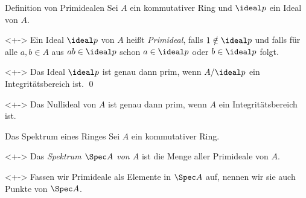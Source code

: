 
\begin{frame}{Definition von Primidealen}
    Sei \(A\) ein kommutativer Ring und \(\ideal p\) ein Ideal von \(A\).
    \begin{definition}<+->
        Ein Ideal \(\ideal p\) von \(A\) heißt \emph{Primideal}, falls
        \(1 \notin \ideal p\) und falls für alle \(a, b \in A\) aus
        \(a b \in \ideal p\) schon \(a \in \ideal p\) oder \(b \in \ideal p\)
        folgt.
    \end{definition}
    \begin{proposition}<+->
        Das Ideal \(\ideal p\) ist genau dann prim, wenn \(A/\ideal p\) ein 
        Integritätsbereich ist.
        \qed
    \end{proposition}
    \begin{example}<+->
        Das Nullideal von \(A\) ist genau dann prim, wenn \(A\) ein
        Integritätsbereich ist.
    \end{example}
\end{frame}

\begin{frame}{Das Spektrum eines Ringes}
    Sei \(A\) ein kommutativer Ring.
    \begin{definition}<+->
        Das \emph{Spektrum \(\Spec A\) von \(A\)} ist die Menge aller Primideale
        von \(A\).
    \end{definition}
    \begin{visibleenv}<+->
        Fassen wir Primideale als Elemente in \(\Spec A\) auf, nennen wir sie
        auch Punkte von \(\Spec A\).
    \end{visibleenv}
    
\end{frame}
